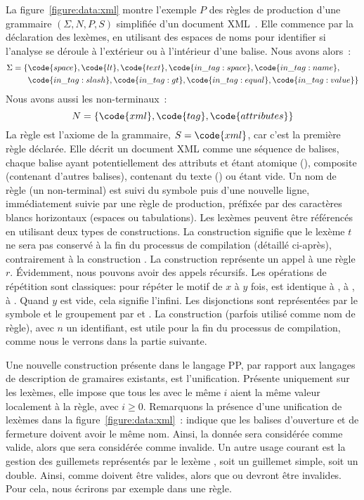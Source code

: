 La figure~\ref{figure:data:xml} montre l'exemple $P$ des règles de production
d'une grammaire $(\Sigma, N, P, S)$ simplifiée d'un document XML~.
Elle commence par la déclaration des lexèmes, en utilisant des espaces de noms
pour identifier si l'analyse se déroule à l'extérieur ou à l'intérieur d'une
balise. Nous avons alors~:
%
\begin{align*} \Sigma = \{ & \code{space}, \code{lt}, \code{text},
\code{in\_tag:space}, \code{in\_tag:name}, \\ & \code{in\_tag:slash},
\code{in\_tag:gt}, \code{in\_tag:equal}, \code{in\_tag:value} \} \end{align*}
%
Nous avons aussi les non-terminaux~:
%
$$N = \{\code{xml}, \code{tag}, \code{attributes}\}$$
%
La règle  est l'axiome de la grammaire, $S = \code{xml}$, car c'est la
première règle déclarée. Elle décrit un document XML comme une séquence de
balises, chaque balise ayant potentiellement des attributs et étant atomique
(), composite (contenant d'autres balises), contenant du texte
() ou étant vide. Un nom de règle (un non-terminal)
est suivi du symbole \code{:} puis d'une nouvelle ligne, immédiatement suivie
par une règle de production, préfixée par des caractères blancs horizontaux
(espaces ou tabulations). Les lexèmes peuvent être référencés en utilisant deux
types de constructions. La construction  signifie que le lexème
$t$ ne sera pas conservé à la fin du processus de compilation (détaillé
ci-après), contrairement à la construction . La construction
 représente un appel à une règle $r$. Évidemment, nous pouvons avoir
des appels récursifs. Les opérations de répétition sont classiques:  pour répéter le motif de $x$ à $y$ fois,  est identique à
, \code{+} à , \code{*} à . Quand $y$
est vide, cela signifie l'infini. Les disjonctions sont représentées par le
symbole \code{\mvert} et le groupement par \code{(} et \code{)}. La construction
 (parfois utilisé comme nom de règle), avec $n$ un identifiant, est
utile pour la fin du processus de compilation, comme nous le verrons dans la
partie suivante.

Une nouvelle construction présente dans le langage PP, par rapport aux langages
de description de gramaires existants, est l'unification. Présente uniquement
sur les lexèmes, elle impose que tous les  avec le même $i$ aient
la même valeur localement à la règle, avec $i \geq 0$.  Remarquons la présence
d'une unification de lexèmes dans la figure~\ref{figure:data:xml}~:
 indique que les balises d'ouverture et de fermeture doivent avoir
le même nom. Ainsi, la donnée  sera considérée comme valide,
alors que  sera considérée comme invalide. Un autre usage
courant est la gestion des guillemets représentés par le lexème , soit un guillemet simple, soit un double. Ainsi,  comme
 doivent être valides, alors que  ou  devront être
invalides. Pour cela, nous écrirons par exemple  dans une règle.

